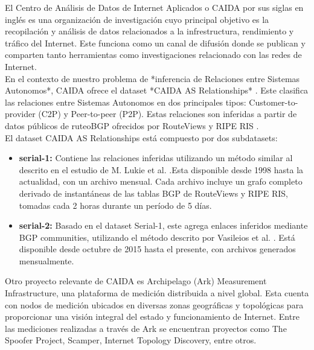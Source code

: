 El Centro de Análisis de Datos de Internet Aplicados o CAIDA por sus siglas en inglés \cite{CAIDA} es una organización de investigación cuyo principal objetivo es la recopilación y análisis de datos relacionados a la infrestructura, rendimiento y tráfico del Internet. Este funciona como un canal de difusión donde se publican y comparten tanto herramientas como investigaciones relacionado con las redes de Internet.\\

En el contexto de nuestro problema de *inferencia de Relaciones entre Sistemas Autonomos*, CAIDA ofrece el dataset *CAIDA AS Relationships* \cite{CAIDAS-relationship}. Este clasifica las relaciones entre Sistemas Autonomos en dos principales tipos: Customer-to-provider (C2P) y Peer-to-peer (P2P). Estas relaciones son inferidas a partir de datos públicos de ruteoBGP ofrecidos por RouteViews \cite{RouteViewsProject} y RIPE RIS \cite{RIPE-RIS}.\\

El dataset CAIDA AS Relationships está compuesto por dos subdatasets:
\begin{itemize}

    \item \textbf{serial-1:} Contiene las relaciones inferidas utilizando un método similar al descrito en el estudio de M. Lukie et al. \cite{ASRank} .Esta disponible desde 1998 hasta la actualidad, con un archivo mensual. Cada archivo incluye un grafo completo derivado de instantáneas de las tablas BGP de RouteViews y RIPE RIS, tomadas cada 2 horas durante un período de 5 días.\\
    
    \item \textbf{serial-2:} Basado en el dataset Serial-1, este agrega enlaces inferidos mediante BGP communities, utilizando el método descrito por Vasileios et al. \cite{Inferring-Multilateral-Peering} . Está disponible desde octubre de 2015 hasta el presente, con archivos generados mensualmente.\\
    
\end{itemize}

Otro proyecto relevante de CAIDA es Archipelago (Ark) Measurement Infrastructure, una plataforma de medición distribuida a nivel global. Esta cuenta con nodos de medición ubicados en diversas zonas geográficas y topológicas para proporcionar una visión integral del estado y funcionamiento de Internet. Entre las mediciones realizadas a través de Ark se encuentran proyectos como The Spoofer Project, Scamper, Internet Topology Discovery, entre otros.\\


